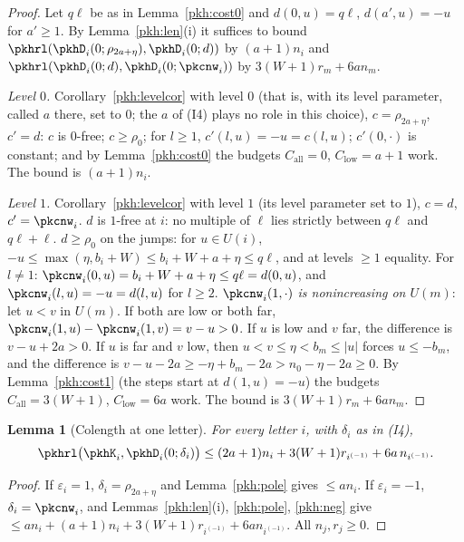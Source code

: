 \documentclass[10pt]{amsart}
\newtheorem{lemma}[theorem]{Lemma}
\theoremstyle{definition}
\theoremstyle{remark}
\begin{document}
\begin{proof}
Let $q\ell$ be as in Lemma~\ref{pkh:cost0} and $d(0,u)=q\ell$, $d(a',u)=-u$ for $a'\ge1$. By
Lemma~\ref{pkh:len}(i) it suffices to bound $\pkhrl(\pkhD_i(0;\rho_{2a+\eta}),\pkhD_i(0;d))$ by $(a+1)n_i$ and
$\pkhrl(\pkhD_i(0;d),\pkhD_i(0;\pkcnw_i))$ by $3(W+1)r_m+6an_m$.

\emph{Level $0$.} Corollary~\ref{pkh:levelcor} with level $0$ (that is, with its level parameter, called $a$ there, set to $0$; the $a$ of (I4) plays no role in this choice), $c=\rho_{2a+\eta}$, $c'=d$: $c$ is $0$-free;
$c\ge\rho_0$; for $l\ge1$, $c'(l,u)=-u=c(l,u)$; $c'(0,\cdot)$ is constant; and by Lemma~\ref{pkh:cost0} the
budgets $C_{\mathrm{all}}=0$, $C_{\mathrm{low}}=a+1$ work. The bound is $(a+1)n_i$.

\emph{Level $1$.} Corollary~\ref{pkh:levelcor} with level $1$ (its level parameter set to $1$), $c=d$, $c'=\pkcnw_i$. $d$ is $1$-free at $i$: no
multiple of $\ell$ lies strictly between $q\ell$ and $q\ell+\ell$. $d\ge\rho_0$ on the jumps: for $u\in U(i)$,
$-u\le\max(\eta,b_i+W)\le b_i+W+a+\eta\le q\ell$, and at levels $\ge1$ equality. For $l\ne1$: $\pkcnw_i(0,u)=
b_i+W+a+\eta\le q\ell=d(0,u)$, and $\pkcnw_i(l,u)=-u=d(l,u)$ for $l\ge2$. \emph{$\pkcnw_i(1,\cdot)$ is
nonincreasing on $U(m)$}: let $u<v$ in $U(m)$. If both are low or both far, $\pkcnw_i(1,u)-\pkcnw_i(1,v)=v-u>0$.
If $u$ is low and $v$ far, the difference is $v-u+2a>0$. If $u$ is far and $v$ low, then $u<v\le\eta<b_m\le|u|$
forces $u\le-b_m$, and the difference is $v-u-2a\ge-\eta+b_m-2a>n_0-\eta-2a\ge0$. By Lemma~\ref{pkh:cost1}
(the steps start at $d(1,u)=-u$) the budgets $C_{\mathrm{all}}=3(W+1)$, $C_{\mathrm{low}}=6a$ work. The bound
is $3(W+1)r_m+6an_m$.
\end{proof}

\begin{lemma}[Colength at one letter]\label{pkh:const}
For every letter $i$, with $\delta_i$ as in (I4),
\[
\pkhrl\bigl(\pkhK_i,\pkhD_i(0;\delta_i)\bigr)\le(2a+1)n_i+3(W+1)r_{i^{(-1)}}+6a\,n_{i^{(-1)}}.
\]
\end{lemma}

\begin{proof}
If $\varepsilon_i=1$, $\delta_i=\rho_{2a+\eta}$ and Lemma~\ref{pkh:pole} gives $\le an_i$. If $\varepsilon_i=-1$,
$\delta_i=\pkcnw_i$, and Lemmas~\ref{pkh:len}(i), \ref{pkh:pole}, \ref{pkh:neg} give $\le an_i+(a+1)n_i+
3(W+1)r_{i^{(-1)}}+6an_{i^{(-1)}}$. All $n_j,r_j\ge0$.
\end{proof}
\end{document}
